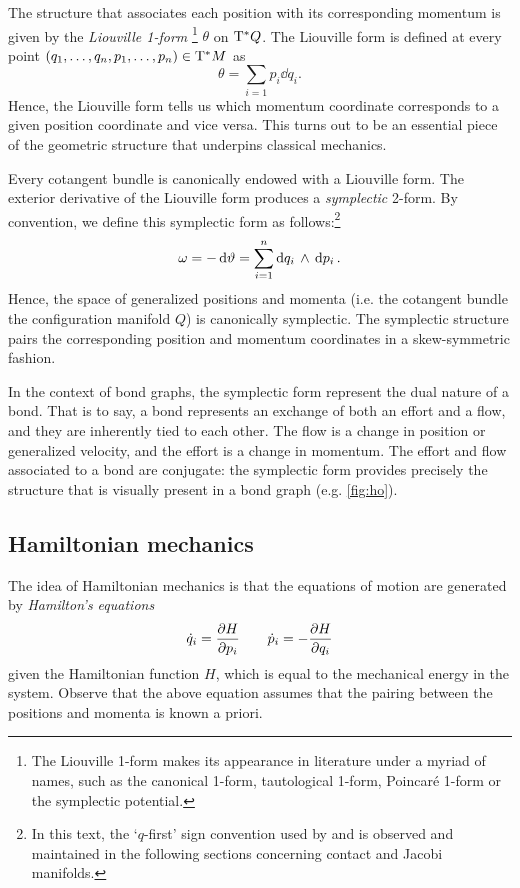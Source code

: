 The structure that associates each position with its corresponding momentum is given by the \emph{Liouville 1-form} \footnote
{
    The Liouville 1-form makes its appearance in literature under a myriad of names, such as the canonical 1-form, tautological 1-form, Poincaré 1-form or the symplectic potential.
}
\(\theta\) on \(\mathrm{T}^*Q\). The Liouville form is defined at every point \( (q_1, \ldots, q_n, p_1, \ldots, p_n) \in \mathrm{T}^*M \) as
\begin{equation}
    \theta = \sum_{i = 1} p_i\dd{q_i}.
\end{equation}
Hence, the Liouville form tells us which momentum coordinate corresponds to a given position coordinate and vice versa. This turns out to be an essential piece of the geometric structure that underpins classical mechanics.

Every cotangent bundle is canonically endowed with a Liouville form. The exterior derivative of the Liouville form produces a \emph{symplectic} 2-form. By convention, we define this symplectic form as follows:\footnote
{
    In this text, the `\(q\)-first' sign convention used by \citet{Abraham1978} and \citet{Cannas2001} is observed and maintained in the following sections concerning contact and Jacobi manifolds.
}
\begin{equation}
     \omega = -\dd{\vartheta} = \sum_{i = 1}^n  \dd{q_i}\,\wedge\,\dd{p_i} .
\end{equation}
Hence, the space of generalized positions and momenta (i.e. the cotangent bundle the configuration manifold \(Q\)) is canonically symplectic. The symplectic structure pairs the corresponding position and momentum coordinates in a skew-symmetric fashion.

In the context of bond graphs, the symplectic form represent the dual nature of a bond. That is to say, a bond represents an exchange of both an effort and a flow, and they are inherently tied to each other. The flow is a change in position or generalized velocity, and the effort is a change in momentum. The effort and flow associated to a bond are conjugate: the symplectic form provides precisely the structure that is visually present in a bond graph (e.g. \cref{fig:ho}).

\subsection{Hamiltonian mechanics}
The idea of Hamiltonian mechanics is that the equations of motion are generated by \emph{Hamilton's equations}
\begin{equation}
     \dot{q}_i = \pdv{H}{p_i} \qquad \dot{p}_i = -\pdv{H}{q_i}
\end{equation}
given the Hamiltonian function \(H\), which is equal to the mechanical energy in the system. Observe that the above equation assumes that the pairing between the positions and momenta is known a priori. 

